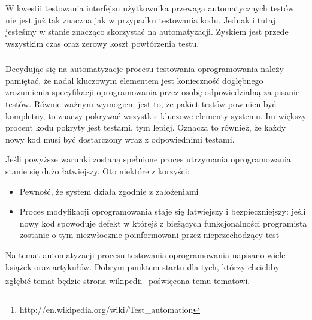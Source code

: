         W kwestii testowania interfejsu użytkownika przewaga automatycznych testów nie jest już tak znaczna jak w przypadku testowania kodu. Jednak i tutaj jesteśmy w stanie znacząco skorzystać na automatyzacji. Zyskiem jest przede wszystkim czas oraz zerowy koszt powtórzenia testu.
        
      \subsubsection{}

        Decydując się na automatyzacje procesu testowania oprogramowania należy pamiętać, że nadal kluczowym elementem jest konieczność dogłębnego zrozumienia specyfikacji oprogramowania przez osobę odpowiedzialną za pisanie testów. Równie ważnym wymogiem jest to, że pakiet testów powinien być kompletny, to znaczy pokrywać wszystkie kluczowe elementy systemu. Im większy procent kodu pokryty jest testami, tym lepiej. Oznacza to również, że każdy nowy kod musi być dostarczony wraz z odpowiednimi testami.
        
        Jeśli powyższe warunki zostaną spełnione proces utrzymania oprogramowania stanie się dużo łatwiejszy. Oto niektóre z korzyści:
        
         \begin{itemize}
     	    \item Pewność, że system działa zgodnie z założeniami
     	    \item Proces modyfikacji oprogramowania staje się łatwiejszy i bezpieczniejszy: jeśli nowy kod spowoduje defekt w którejś z bieżących funkcjonalności programista zostanie o tym niezwłocznie poinformowani przez nieprzechodzący test
     	  \end{itemize}
     	  
     	  Na temat automatyzacji procesu testowania oprogramowania napisano wiele książek oraz artykułów. Dobrym punktem startu dla tych, którzy chcieliby zgłębić temat będzie strona wikipedii\footnote{http://en.wikipedia.org/wiki/Test\_automation} \nocite{wiki_test_automation} poświęcona temu tematowi.

